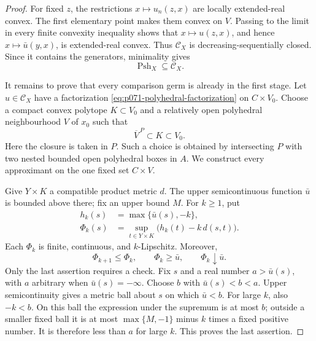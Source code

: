 \begin{proof}
For fixed \(z\), the restrictions \(x\mapsto u_n(z,x)\) are locally
extended-real convex.  The first elementary point makes them convex on
\(V\).  Passing to the limit in every finite convexity inequality shows
that \(x\mapsto u(z,x)\), and hence
\(x\mapsto\bar u(y,x)\), is extended-real convex.  Thus
\(\mathscr C_X\) is decreasing-sequentially closed.  Since it contains
the generators, minimality gives
\begin{equation}
                         \operatorname{Psh}_X\subseteq\mathscr C_X.
 \label{eq:p071-polyhedral-minimality}
\end{equation}

It remains to prove that every comparison germ is already in the first
stage.  Let \(u\in\mathscr C_X\) have a factorization
\eqref{eq:p071-polyhedral-factorization} on \(C\times V_0\).  Choose a
compact convex polytope \(K\subset V_0\) and a relatively open polyhedral
neighbourhood \(V\) of \(x_0\) such that
\begin{equation}
                         \overline V^{\,P}\subset K\subset V_0.
 \label{eq:p071-polyhedral-nested-core}
\end{equation}
Here the closure is taken in \(P\).  Such a choice is obtained by
intersecting \(P\) with two nested bounded open polyhedral boxes in
\(A\).  We construct every approximant on the one fixed set \(C\times V\).

Give \(Y\times K\) a compatible product metric \(d\).  The upper
semicontinuous function \(\bar u\) is bounded above there; fix an upper
bound \(M\).  For \(k\geq1\), put
\begin{align}
 h_k(s)&=\max\{\bar u(s),-k\},\\
 \Phi_k(s)&=\sup_{t\in Y\times K}
                 \bigl(h_k(t)-k\,d(s,t)\bigr).
 \label{eq:p071-polyhedral-usc-regularization}
\end{align}
Each \(\Phi_k\) is finite, continuous, and \(k\)-Lipschitz.  Moreover,
\begin{equation}
                \Phi_{k+1}\leq\Phi_k,\qquad
                \Phi_k\geq\bar u,\qquad
                \Phi_k\downarrow\bar u .
 \label{eq:p071-polyhedral-usc-convergence}
\end{equation}
Only the last assertion requires a check.  Fix \(s\) and a real number
\(a>\bar u(s)\), with \(a\) arbitrary when \(\bar u(s)=-\infty\).
Choose \(b\) with \(\bar u(s)<b<a\).  Upper semicontinuity gives a metric
ball about \(s\) on which \(\bar u<b\).  For large \(k\), also \(-k<b\).
On this ball the expression under the supremum is at most \(b\); outside a
smaller fixed ball it is at most
\(\max\{M,-1\}\) minus \(k\) times a fixed positive number.  It is therefore
less than \(a\) for large \(k\).  This proves the last assertion.


\end{proof}
